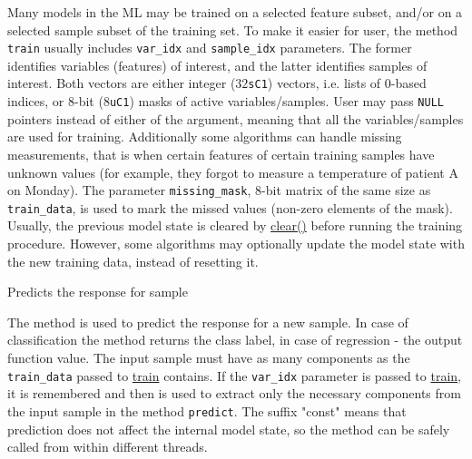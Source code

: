 Many models in the ML may be trained on a selected feature subset, and/or on a selected sample subset of the training set. To make it easier for user, the method \texttt{train} usually includes \texttt{var\_idx} and \texttt{sample\_idx} parameters. The former identifies variables (features) of interest, and the latter identifies samples of interest. Both vectors are either integer (\texttt{$32$sC1}) vectors, i.e. lists of $0$-based indices, or $8$-bit (\texttt{$8$uC1}) masks of active variables/samples. User may pass \texttt{NULL} pointers instead of either of the argument, meaning that all the variables/samples are used for training.
\newline
\newline
Additionally some algorithms can handle missing measurements, that is when certain features of certain training samples have unknown values (for example, they forgot to measure a temperature of patient A on Monday). The parameter \texttt{missing\_mask}, $8$-bit matrix of the same size as \texttt{train\_data}, is used to mark the missed values (non-zero elements of the mask).
\newline
\newline
Usually, the previous model state is cleared by \href{#CvStatModel_clear}{clear()} before running the training procedure. However, some algorithms may optionally update the model state with the new training data, instead of resetting it.



Predicts the response for sample


The method is used to predict the response for a new sample. In case of classification the method returns the class label, in case of regression - the output function value. The input sample must have as many components as the \texttt{train\_data} passed to \href{#CvStatModel_train}{train} contains. If the \texttt{var\_idx} parameter is passed to \href{#CvStatModel_train}{train}, it is remembered and then is used to extract only the necessary components from the input sample in the method \texttt{predict}.
\newline
\newline
The suffix "const" means that prediction does not affect the internal model state, so the method can be safely called from within different threads.

